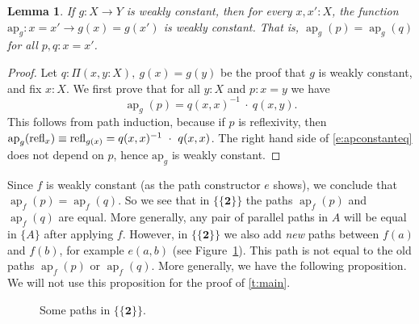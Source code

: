 \documentclass[square]{sigplanconf}
\newcommand{\fa}[2]{\ensuremath{\Pi(#1),\ #2}}
\newcommand{\bool}{\ensuremath{\mathbf{2}}}
\DeclareMathOperator{\myap}{ap}
\newcommand{\refl}{\textnormal{refl}}
\newcommand{\ap}[2]{\ensuremath{\myap_{#1}(#2)}}
\newtheorem{lemma}[theorem]{Lemma}
\theoremstyle{definition}
\theoremstyle{remark}
\begin{document}
\begin{lemma}\label{l:apconstant}
  If $g:X\to Y$ is weakly constant, then for every $x, x' : X$, the function $\text{ap}_g:x=x'\to
  g(x)=g(x')$ is weakly constant. That is, $\ap gp=\ap gq$ for all $p,q:x=x'$.
\end{lemma}
\begin{proof}
  Let $q : \fa{x, y : X}{g(x)=g(y)}$ be the proof that $g$ is weakly constant, and fix $x : X$. We
  first prove that for all $y : X$ and $p : x = y$ we have
  \begin{equation}\label{e:apconstanteq}
    \ap{g}{p} = q(x,x)^{-1}\ \cdot\ q(x,y).
  \end{equation}
  This follows from path induction, because if $p$ is reflexivity, then $\ap{g}{\refl_x} \equiv
  \refl_{g(x)} = q(x,x)^{-1}\ \cdot\ q(x,x)$. The right hand side of \eqref{e:apconstanteq} does not
  depend on $p$, hence $\text{ap}_g$ is weakly constant.
\end{proof}
Since $f$ is weakly constant (as the path constructor $e$ shows), we conclude that $\ap{f}{p} =
\ap{f}{q}$. So we see that in $\{\{\bool\}\}$ the paths $\ap fp$ and $\ap fq$ are equal. More
generally, any pair of parallel paths in $A$ will be equal in $\{A\}$ after applying $f$. However,
in $\{\{\bool\}\}$ we also add \emph{new} paths between $f(a)$ and $f(b)$, for example $e(a,b)$ (see
Figure~\ref{f:ttbool}). This path is not equal to the old paths $\ap{f}{p}$ or $\ap{f}{q}$. More
generally, we have the following proposition. We will not use this proposition for the proof of
\ref{t:main}.

\begin{figure}
\begin{center}
\end{center}
\caption{Some paths in $\{\{\bool\}\}$.}
\label{f:ttbool}
\end{figure}
\end{document}

